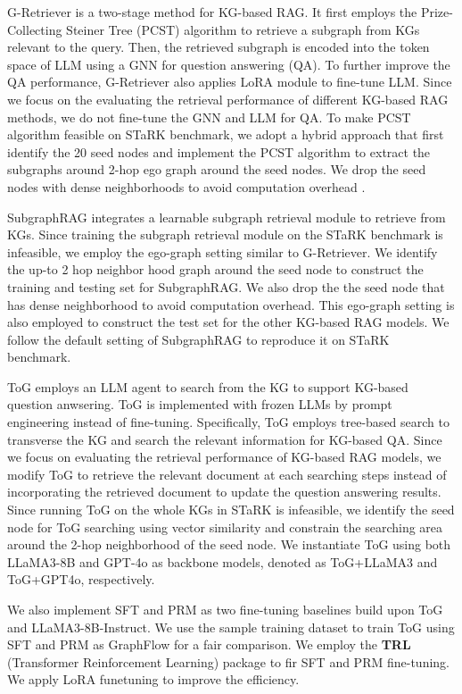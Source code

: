 \documentclass{article}
\begin{document}
 
G-Retriever \cite{he2024g} is a two-stage method for KG-based RAG.
It first employs the Prize-Collecting Steiner Tree (PCST) \cite{archer2011improved} algorithm to retrieve a subgraph from KGs relevant to the query. 
Then, the retrieved subgraph is encoded into the token space of LLM using a GNN for question answering (QA).
To further improve the QA performance, G-Retriever also applies LoRA module to fine-tune LLM.
Since we focus on the evaluating the retrieval performance of different KG-based RAG methods, we do not fine-tune the GNN and LLM for QA.
To make PCST algorithm feasible on STaRK benchmark, we adopt a hybrid approach that first identify the 20 seed nodes and implement the PCST algorithm to extract the subgraphs around 2-hop ego graph around the seed nodes.
We drop the seed nodes with dense neighborhoods to avoid computation overhead \cite{lee2024hybgrag,lei2025mixture}.

SubgraphRAG \cite{liretrieval} integrates a learnable subgraph retrieval module to retrieve from KGs.
Since training the subgraph retrieval module on the STaRK benchmark is infeasible, we employ the ego-graph setting similar to G-Retriever.
We identify the up-to 2 hop neighbor hood graph around the seed node to construct the training and testing set for SubgraphRAG.
We also drop the the seed node that has dense neighborhood to avoid computation overhead.
This ego-graph setting is also employed to construct the test set for the other KG-based RAG models.
We follow the default setting of SubgraphRAG to reproduce it on STaRK benchmark.


ToG \cite{sunthink} employs an LLM agent to search from the KG to support KG-based question anwsering. 
ToG is implemented with frozen LLMs by prompt engineering instead of fine-tuning.
Specifically, ToG employs tree-based search \cite{yao2023tree} to transverse the KG and search the relevant information for KG-based QA.
Since we focus on evaluating the retrieval performance of KG-based RAG models, we modify ToG to retrieve the relevant document at each searching steps instead of incorporating the retrieved document to update the question answering results.
Since running ToG on the whole KGs in STaRK is infeasible, we identify the seed node for ToG searching using vector similarity and constrain the searching area around the 2-hop neighborhood of the seed node.
We instantiate ToG using both LLaMA3-8B and GPT-4o as backbone models, denoted as ToG+LLaMA3 and ToG+GPT4o, respectively.

We also implement SFT and PRM as two fine-tuning baselines build upon ToG and LLaMA3-8B-Instruct. We use the sample training dataset to train ToG using SFT and PRM as GraphFlow for a fair comparison. We employ the \textbf{TRL} (Transformer Reinforcement Learning) package to fir SFT and PRM fine-tuning. We apply LoRA funetuning to improve the efficiency.
\end{document}
